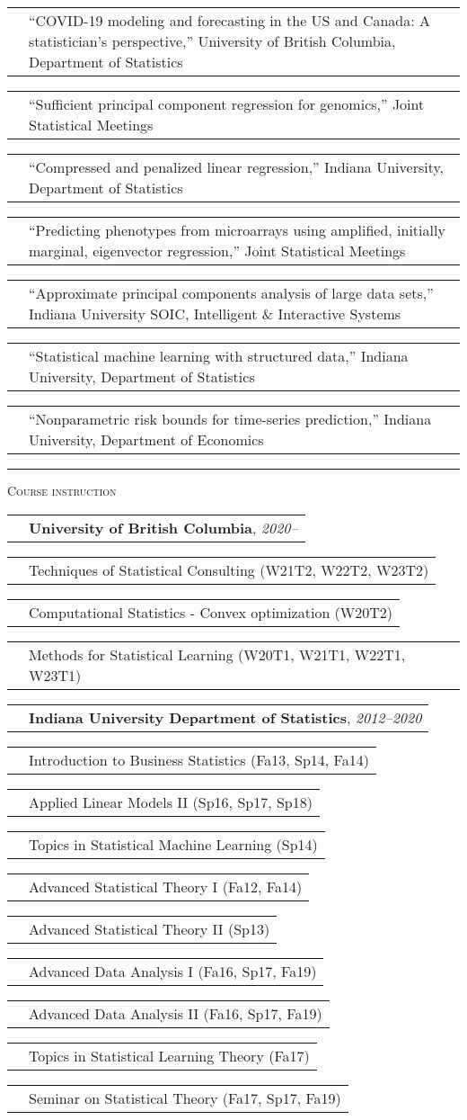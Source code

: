 \documentclass[11pt,letterpaper]{minimal/moderncv}
\makeatletter
\renewcommand{\section}[1]{  \par\addvspace{15pt}%
  \parbox[t]{\hintscolumnwidth}{\strut\raggedleft\raisebox{4pt}%
  {\rule{\hintscolumnwidth}{2pt}}}%
  \hspace{\separatorcolumnwidth}%
  \textsc{\Large #1}\par\nobreak\addvspace{6pt}%
}
\renewcommand*{\cvitem}[2]{%
  \begin{tabular}{@{}p{\hintscolumnwidth}@{\hspace{\separatorcolumnwidth}}%
    p{\maincolumnwidth}@{}}%
    \raggedleft {#1} &  {#2}%
  \end{tabular}%
}
\makeatother
\begin{document}
\cvitem{2021}{``COVID-19 modeling and forecasting in the US and Canada:
  A statistician's perspective,'' University of British Columbia,
  Department of Statistics}

\cvitem{2019}{``Sufficient principal component regression for
  genomics,'' Joint Statistical Meetings}

\cvitem{2017}{ ``Compressed and penalized linear regression,'' Indiana
  University, Department of Statistics}

\cvitem{}{ ``Predicting phenotypes from microarrays using amplified,
  initially marginal, eigenvector regression,'' Joint Statistical Meetings}

\cvitem{2015}{ ``Approximate principal components analysis of large data sets,''
  Indiana University SOIC, Intelligent \& Interactive Systems}

\cvitem{2014}{ ``Statistical machine learning with structured data,''
  Indiana University, Department of Statistics}

\cvitem{2012}{ ``Nonparametric risk bounds for time-series prediction,''
  Indiana University, Department of Economics}





\section{Course instruction}

\vspace{6pt}
\cvitem{}{\textbf{University of British Columbia}, \emph{2020--}}
\cvitem{Stat 550}{Techniques of Statistical Consulting (W21T2, W22T2, W23T2)}
\cvitem{Stat 535a}{Computational Statistics - Convex optimization (W20T2)}
\cvitem{Stat 406}{Methods for Statistical Learning (W20T1, W21T1, W22T1, W23T1)}

\vspace{6pt}
\cvitem{}{\textbf{Indiana University Department of Statistics},
  \emph{2012--2020}}
\cvitem{S301}{Introduction to Business Statistics (Fa13, Sp14, Fa14)}
\cvitem{S432}{Applied Linear Models II (Sp16, Sp17, Sp18)}
\cvitem{S682}{Topics in Statistical Machine Learning (Sp14)}
\cvitem{S721}{Advanced Statistical Theory I (Fa12, Fa14)}
\cvitem{S722}{Advanced Statistical Theory II (Sp13)}
\cvitem{S771}{Advanced Data Analysis I (Fa16, Sp17, Fa19)}
\cvitem{S772}{Advanced Data Analysis II (Fa16, Sp17, Fa19)}
\cvitem{S782}{Topics in Statistical Learning Theory (Fa17)}
\cvitem{S785}{Seminar on Statistical Theory (Fa17, Sp17, Fa19)}
\end{document}
